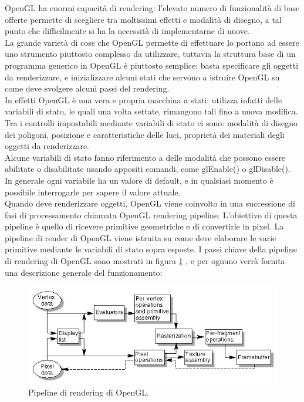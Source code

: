 OpenGL ha enormi capacità di rendering: l’elevato numero di funzionalità di base offerte permette di scegliere tra moltissimi effetti e modalità di disegno, a tal punto che difficilmente si ha la necessità di implementarne di nuove.
\\
La grande varietà di cose che OpenGL permette di effettuare lo portano ad essere uno strumento piuttosto complesso da utilizzare, tuttavia la struttura base di un programma generico in OpenGL è piuttosto semplice: basta specificare gli oggetti da renderizzare, e inizializzare alcuni stati che servono a istruire OpenGL su come deve svolgere alcuni passi del rendering. 
\\
In effetti OpenGL è una vera e propria macchina a stati: utilizza infatti delle variabili di stato, le quali una volta settate, rimangono tali fino a nuova modifica. Tra i controlli impostabili mediante variabili di stato ci sono: modalità di disegno dei poligoni, posizione e caratteristiche delle luci, proprietà dei materiali degli oggetti da renderizzare.
\\
Alcune variabili di stato fanno riferimento a delle modalità che possono essere abilitate o disabilitate usando appositi comandi, come glEnable() o glDisable(). In generale ogni variabile ha un valore di default, e in qualsiasi momento è possibile interrogarle per sapere il valore attuale.
\\
Quando deve renderizzare oggetti, OpenGL viene coinvolto in una successione di fasi di processamento chiamata OpenGL rendering pipeline. L’obiettivo di questa pipeline è quello di ricevere primitive geometriche e di convertirle in pixel. La pipeline di render di OpenGL viene istruita su come deve elaborare le varie primitive mediante le variabili di stato sopra esposte.
I passi chiave della pipeline di rendering di OpenGL sono mostrati in figura \ref{fig:stato_arte_opengl_pipeline} , e per ognuno verrà fornita una descrizione generale del funzionamento:
\\
\begin{figure}[htb]
 \centering
 \includegraphics[width=0.9\linewidth]{images/chapter_stato_arte/stato_arte_opengl_pipeline.png}\hfill
 \caption[Pipeline di rendering di OpenGL]{Pipeline di rendering di OpenGL.}
 \label{fig:stato_arte_opengl_pipeline}
\end{figure}
